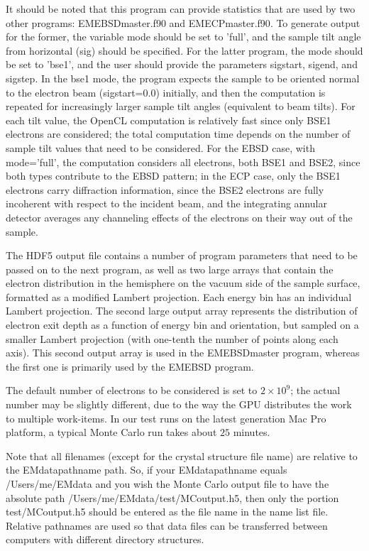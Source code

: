 \documentclass[DIV=calc, paper=letter, fontsize=11pt]{scrartcl}	 %
\begin{document}
It should be noted that this program can provide statistics that are used by two other programs: \textsf{EMEBSDmaster.f90} and
\textsf{EMECPmaster.f90}.  To generate output for the former, the variable \textsf{mode} should be set to \textsf{'full'}, 
and the sample tilt angle from horizontal (\textsf{sig}) should be specified.  For the latter program, the \textsf{mode} should
be set to \textsf{'bse1'}, and the user should provide the parameters \textsf{sigstart}, \textsf{sigend}, and \textsf{sigstep}.  In the 
bse1 mode, the program expects the sample to be oriented normal to the electron beam (\textsf{sigstart=0.0}) initially, and 
then the computation is repeated for increasingly larger sample tilt angles (equivalent to beam tilts).  For each tilt value, the 
OpenCL computation is relatively fast since only BSE1 electrons are considered; the total computation time depends on the 
number of sample tilt values that need to be considered.  For the EBSD case, with \textsf{mode='full'}, the computation 
considers all electrons, both BSE1 and BSE2, since both types contribute to the EBSD pattern; in the ECP case, only the 
BSE1 electrons carry diffraction information, since the BSE2 electrons are fully incoherent with respect to the incident beam,
and the integrating annular detector averages any channeling effects of the electrons on their way out of the sample.

The HDF5 output file contains a number of program parameters
that need to be passed on to the next program, as well as two large arrays that contain the electron distribution in the hemisphere on
the vacuum side of the sample surface, formatted as a modified Lambert projection.  Each energy bin has an individual Lambert 
projection.  The second large output array represents the distribution of electron exit depth as a function of energy bin and
orientation, but sampled on a smaller Lambert projection (with one-tenth the number of points along each axis).  This second output
array is used in the \textsf{EMEBSDmaster} program, whereas the first one is primarily used by the \textsf{EMEBSD} program.

The default number of electrons to be considered is set to $2\times 10^9$; the actual number may be slightly different, due 
to the way the GPU distributes the work to multiple work-items.  In our test runs on the latest generation Mac Pro platform, 
a typical Monte Carlo run takes about $25$ minutes.

Note that all filenames (except for the crystal structure file name) are relative to the \textsf{EMdatapathname} path.  So, if your 
\textsf{EMdatapathname} equals \textsf{/Users/me/EMdata} and you wish the Monte Carlo output file to have the absolute path
\textsf{/Users/me/EMdata/test/MCoutput.h5}, then only the portion \textsf{test/MCoutput.h5} should be entered as the file name
in the name list file.  Relative pathnames are used so that data files can be transferred between computers with different directory
structures.
\end{document}
